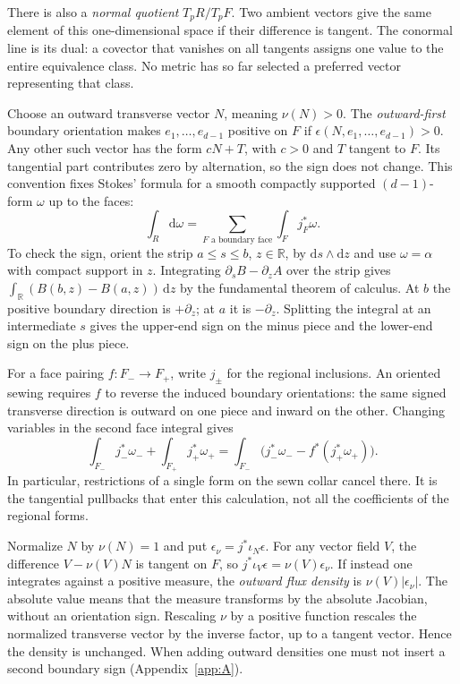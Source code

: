 There is also a \emph{normal quotient} $T_pR/T_pF$. Two ambient vectors give the same element of this one-dimensional space if their difference is tangent. The conormal line is its dual: a covector that vanishes on all tangents assigns one value to the entire equivalence class. No metric has so far selected a preferred vector representing that class.

Choose an outward transverse vector $N$, meaning $\nu(N)>0$. The \emph{outward-first} boundary orientation makes $e_1,\ldots,e_{d-1}$ positive on $F$ if $\epsilon(N,e_1,\ldots,e_{d-1})>0$. Any other such vector has the form $cN+T$, with $c>0$ and $T$ tangent to $F$. Its tangential part contributes zero by alternation, so the sign does not change. This convention fixes Stokes' formula for a smooth compactly supported $(d-1)$-form $\omega$ up to the faces:
\[
   \int_R\mathrm{d}\omega=\sum_{F\text{ a boundary face}}\int_F j_F^*\omega .
\]
To check the sign, orient the strip $a\leq s\leq b$, $z\in\mathbb R$, by $\mathrm{d}s\wedge\mathrm{d}z$ and use $\omega=\alpha$ with compact support in $z$. Integrating $\partial_s B-\partial_z A$ over the strip gives $\int_{\mathbb R}(B(b,z)-B(a,z))\,\mathrm{d}z$ by the fundamental theorem of calculus. At $b$ the positive boundary direction is $+\partial_z$; at $a$ it is $-\partial_z$. Splitting the integral at an intermediate $s$ gives the upper-end sign on the minus piece and the lower-end sign on the plus piece.

For a face pairing $f:F_-\to F_+$, write $j_\pm$ for the regional inclusions. An oriented sewing requires $f$ to reverse the induced boundary orientations: the same signed transverse direction is outward on one piece and inward on the other. Changing variables in the second face integral gives
\[
 \int_{F_-}j_-^*\omega_-+\int_{F_+}j_+^*\omega_+
   =\int_{F_-}\bigl(j_-^*\omega_- - f^*(j_+^*\omega_+)\bigr).
\]
In particular, restrictions of a single form on the sewn collar cancel there. It is the tangential pullbacks that enter this calculation, not all the coefficients of the regional forms.

Normalize $N$ by $\nu(N)=1$ and put $\epsilon_\nu=j^*\iota_N\epsilon$. For any vector field $V$, the difference $V-\nu(V)N$ is tangent on $F$, so $j^*\iota_V\epsilon=\nu(V)\epsilon_\nu$. If instead one integrates against a positive measure, the \emph{outward flux density} is $\nu(V)|\epsilon_\nu|$. The absolute value means that the measure transforms by the absolute Jacobian, without an orientation sign. Rescaling $\nu$ by a positive function rescales the normalized transverse vector by the inverse factor, up to a tangent vector. Hence the density is unchanged. When adding outward densities one must not insert a second boundary sign (Appendix~\ref{app:A}).

